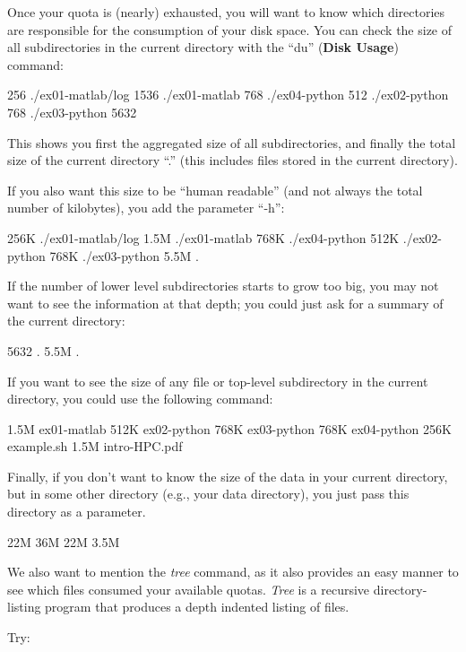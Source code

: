 Once your quota is (nearly) exhausted, you will want to know which directories
are responsible for the consumption of your disk space. You can check the size
of all subdirectories in the current directory with the ``du'' (\textbf{Disk
Usage}) command:

\begin{prompt}
256 ./ex01-matlab/log
1536 ./ex01-matlab
768 ./ex04-python
512 ./ex02-python
768 ./ex03-python
5632
\end{prompt}

This shows you first the aggregated size of all subdirectories, and finally the
total size of the current directory ``.'' (this includes files stored in the
current directory).

If you also want this size to be ``human readable'' (and not always the total
number of kilobytes), you add the parameter ``-h'':

\begin{prompt}
256K ./ex01-matlab/log
1.5M ./ex01-matlab
768K ./ex04-python
512K ./ex02-python
768K ./ex03-python
5.5M .
\end{prompt}

If the number of lower level subdirectories starts to grow too big, you may not
want to see the information at that depth; you could just ask for a summary of
the current directory:

\begin{prompt}
5632 .
5.5M .
\end{prompt}

If you want to see the size of any file or top-level subdirectory in the
current directory, you could use the following command:

\begin{prompt}
1.5M ex01-matlab
512K ex02-python
768K ex03-python
768K ex04-python
256K example.sh
1.5M intro-HPC.pdf
\end{prompt}


Finally, if you don't want to know the size of the data in your current
directory, but in some other directory (e.g., your data directory), you just
pass this directory as a parameter.

\begin{prompt}
22M %
36M %
22M %
3.5M %
\end{prompt}

We also want to mention the \emph{tree} command, as it also provides an easy
manner to see which files consumed your available quotas. \emph{Tree} is a
recursive directory-listing program that produces a depth indented listing of
files.

Try:

\begin{prompt}
\end{prompt}

